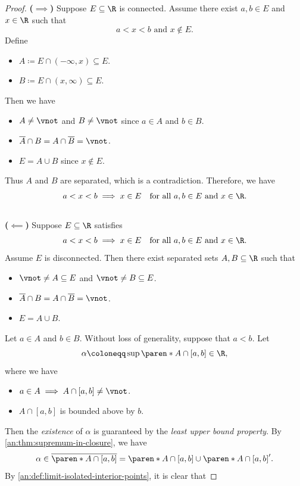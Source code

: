 \begin{proof}
  \textbf{($\implies$)} Suppose $E \subseteq \R$ is connected. Assume there exist $a, b \in E$ and $x \in \R$ such that
  \[
    a < x < b \text{ and } x \notin E.
  \]
  Define
  \begin{itemize}
    \item $A \coloneqq E \cap (-\infty, x) \subseteq E$.
    \item $B \coloneqq E \cap (x, \infty) \subseteq E$.
  \end{itemize}
  Then we have
  \begin{itemize}
    \item $A \neq \vnot$ and $B \neq \vnot$ since $a \in A$ and $b \in B$.
    \item $\overline{A} \cap B = A \cap \overline{B} = \vnot$.
    \item $E = A \cup B$ since $x \notin E$.
  \end{itemize}
  Thus $A$ and $B$ are separated, which is a contradiction. Therefore, we have
  \[
    a < x < b \implies x \in E \quad \text{for all } a, b \in E \text{ and } x \in \R.
  \]
  \\[6mm]
  \textbf{($\impliedby$)} Suppose $E \subseteq \R$ satisfies
  \[
    a < x < b \implies x \in E \quad \text{for all } a, b \in E \text{ and } x \in \R.
  \]
  Assume $E$ is disconnected. Then there exist separated sets $A, B \subseteq \R$ such that
  \begin{itemize}
    \item $\vnot \neq A \subseteq E$ and $\vnot \neq B \subseteq E$.
    \item $\overline{A} \cap B = A \cap \overline{B} = \vnot$.
    \item $E = A \cup B$.
  \end{itemize}
  Let $a \in A$ and $b \in B$. Without loss of generality, suppose that $a < b$. Let
  \[
    \alpha \coloneqq \sup\paren*{A \cap [a, b]} \in \R,
  \]
  where we have
  \begin{itemize}
    \item $a \in A \implies A \cap [a, b] \neq \vnot$.
    \item $A \cap [a, b]$ is bounded above by $b$.
  \end{itemize}
  Then the \emph{existence} of $\alpha$ is guaranteed by the \emph{least upper bound property}.
  By \cref{an:thm:supremum-in-closure}, we have
  \[
    \alpha \in \overline{\paren*{A \cap [a, b]}} = \paren*{A \cap [a, b]} \cup \paren*{A \cap [a, b]}'.
  \]
  By \cref{an:def:limit-isolated-interior-points}, it is clear that

\end{proof}
